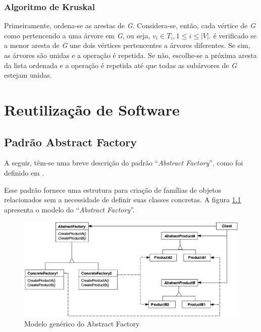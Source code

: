 \begin{apendicesenv}
\subsection{Algoritmo de Kruskal}

Primeiramente, ordena-se as arestas de \textit{G}. Considera-se, então, cada vértice de \textit{G} como pertencendo a uma árvore em \textit{G}, ou seja, $\textit{v}_i \in \textit{T}_i , 1 \leq i \leq |\textit{V}|$. é verificado se a menor aresta de \textit{G} une dois vértices pertencentes a árvores diferentes. Se sim, as árvores são unidas e a operação é repetida. Se não, escolhe-se a próxima aresta da lista ordenada e a operação é repetida até que todas as subárvores de \textit{G} estejam unidas.

\chapter{Reutilização de Software}

\section{Padrão Abstract Factory}
\label{sec:padrao abstract factory}

A seguir, têm-se uma breve descrição do padrão ``\textit{Abstract Factory}'', como foi definido em \cite{Gamma:1995}.

Esse padrão fornece uma estrutura para criação de famílias de objetos relacionados sem a necessidade de definir suas classes concretas. A figura \ref{abstract factory} apresenta o modelo do ``\textit{Abstract Factory}''.

\begin{figure}[!h]
	\centering
	\includegraphics[scale=0.5]{figuras/capitulo2/abstract_factory.eps}
	\caption[Modelo genérico do Abstract Factory]{Modelo genérico do Abstract Factory \cite{Gamma:1995}}
	\label{abstract factory}
\end{figure}


\end{apendicesenv}
